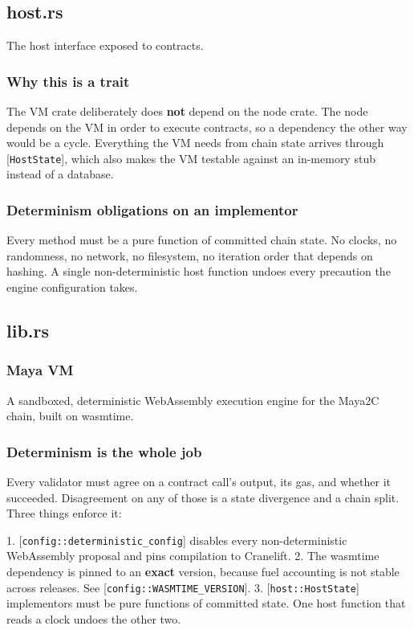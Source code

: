 \documentclass[11pt,a4paper]{article}
\begin{document}
\subsection{host.rs}
The host interface exposed to contracts.

\subsubsection{Why this is a trait}

The VM crate deliberately does \textbf{not} depend on the node crate. The node
depends on the VM in order to execute contracts, so a dependency the other
way would be a cycle. Everything the VM needs from chain state arrives
through [\texttt{HostState}], which also makes the VM testable against an in-memory
stub instead of a database.

\subsubsection{Determinism obligations on an implementor}

Every method must be a pure function of committed chain state. No clocks, no
randomness, no network, no filesystem, no iteration order that depends on
hashing. A single non-deterministic host function undoes every precaution the
engine configuration takes.

\subsection{lib.rs}
\subsubsection{Maya VM}

A sandboxed, deterministic WebAssembly execution engine for the Maya2C chain,
built on wasmtime.

\subsubsection{Determinism is the whole job}

Every validator must agree on a contract call's output, its gas, and whether
it succeeded. Disagreement on any of those is a state divergence and a chain
split. Three things enforce it:

1. [\texttt{config::deterministic\_config}] disables every non-deterministic
   WebAssembly proposal and pins compilation to Cranelift.
2. The wasmtime dependency is pinned to an \textbf{exact} version, because fuel
   accounting is not stable across releases. See
   [\texttt{config::WASMTIME\_VERSION}].
3. [\texttt{host::HostState}] implementors must be pure functions of committed
   state. One host function that reads a clock undoes the other two.
\end{document}
